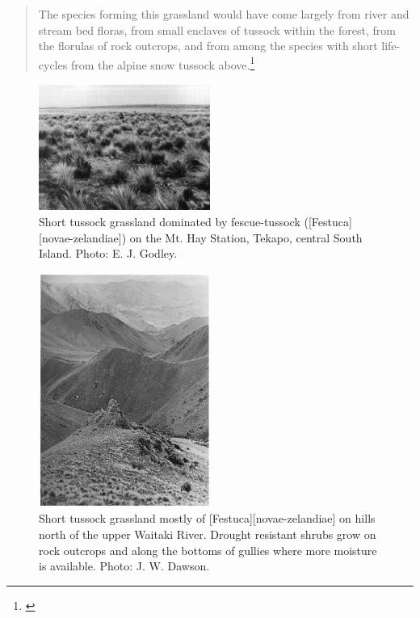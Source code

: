 \begin{quote}
	The species forming this grassland would have come largely from river and stream bed floras, from small enclaves of tussock within the forest, from the florulas of rock outcrops, and from among the species with short life-cycles from the alpine snow tussock above.\footnote{\cite{connor1969montane}}
\end{quote}

\begin{figure}
	\includegraphics[width=0.5\textwidth]{graphics/figure81short-tussock.jpg}
	\centering
	\caption[Short tussock grassland dominated by fescue-tussock]{Short tussock grassland dominated by fescue-tussock ([Festuca][novae-zelandiae]) on the Mt.
	Hay Station, Tekapo, central South Island.
	Photo:  E. J. Godley.}%
	\label{fig:81short-tussock}
\end{figure}

\begin{figure}
	\includegraphics[width=0.5\textwidth]{graphics/figure82short-tussock.jpg}
	\centering
	\caption[Short tussock grassland mostly of \emph{Festuca novae-zelandiae}]{Short tussock grassland mostly of [Festuca][novae-zelandiae] on hills north of the upper Waitaki River.
	Drought resistant shrubs grow on rock outcrops and along the bottoms of gullies where more moisture is available.  Photo:  J. W. Dawson.}%
	\label{fig:82short-tussock}
\end{figure}

